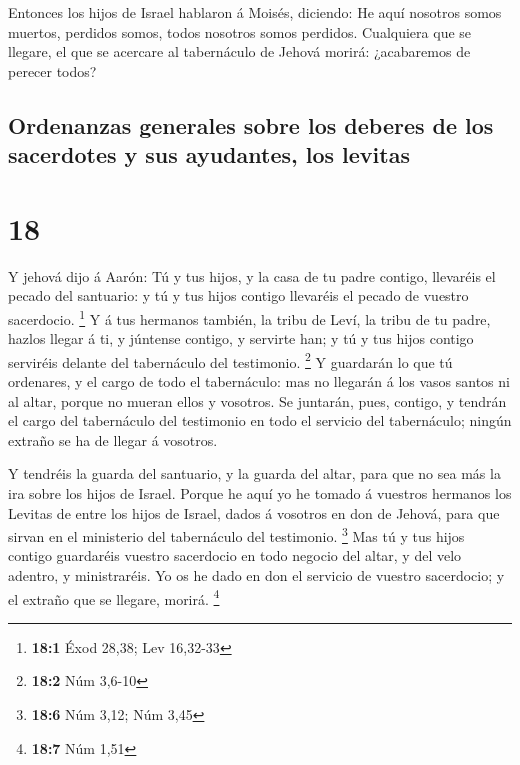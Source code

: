  Entonces los hijos de Israel hablaron á Moisés, diciendo:
He aquí nosotros somos muertos, perdidos somos, todos nosotros somos
perdidos.  Cualquiera que se llegare, el que se acercare al
tabernáculo de Jehová morirá: ¿acabaremos de perecer todos?

\hypertarget{ordenanzas-generales-sobre-los-deberes-de-los-sacerdotes-y-sus-ayudantes-los-levitas}{%
\subsection{Ordenanzas generales sobre los deberes de los sacerdotes y
sus ayudantes, los
levitas}\label{ordenanzas-generales-sobre-los-deberes-de-los-sacerdotes-y-sus-ayudantes-los-levitas}}

\hypertarget{section-17}{%
\section{18}\label{section-17}}

 Y jehová dijo á Aarón: Tú y tus hijos, y la casa de tu
padre contigo, llevaréis el pecado del santuario: y tú y tus hijos
contigo llevaréis el pecado de vuestro sacerdocio. \footnote{\textbf{18:1}
  Éxod 28,38; Lev 16,32-33}  Y á tus hermanos también, la
tribu de Leví, la tribu de tu padre, hazlos llegar á ti, y júntense
contigo, y servirte han; y tú y tus hijos contigo serviréis delante del
tabernáculo del testimonio. \footnote{\textbf{18:2} Núm 3,6-10}
 Y guardarán lo que tú ordenares, y el cargo de todo el
tabernáculo: mas no llegarán á los vasos santos ni al altar, porque no
mueran ellos y vosotros.  Se juntarán, pues, contigo, y
tendrán el cargo del tabernáculo del testimonio en todo el servicio del
tabernáculo; ningún extraño se ha de llegar á vosotros.

 Y tendréis la guarda del santuario, y la guarda del altar,
para que no sea más la ira sobre los hijos de Israel. 
Porque he aquí yo he tomado á vuestros hermanos los Levitas de entre los
hijos de Israel, dados á vosotros en don de Jehová, para que sirvan en
el ministerio del tabernáculo del testimonio. \footnote{\textbf{18:6}
  Núm 3,12; Núm 3,45}  Mas tú y tus hijos contigo guardaréis
vuestro sacerdocio en todo negocio del altar, y del velo adentro, y
ministraréis. Yo os he dado en don el servicio de vuestro sacerdocio; y
el extraño que se llegare, morirá. \footnote{\textbf{18:7} Núm 1,51}

